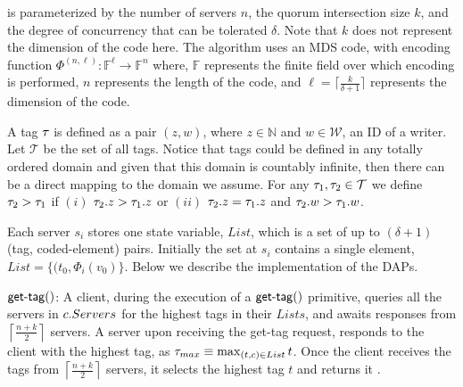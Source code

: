%
\treasmod{} is parameterized by the number of servers $n$, the quorum intersection size $k$, and the degree of concurrency that can be tolerated $\delta$. Note that $k$ does not represent the dimension of the code here. 
%
The algorithm uses an MDS code, with encoding function $\Phi^{(n,\ell)}: \mathbb{F}^{\ell} \rightarrow \mathbb{F}^{n}$ where, $\mathbb{F}$ represents the finite field over which encoding is performed, $n$ represents the length of the code, and $\ell = {\lceil \frac{k}{\delta+1} \rceil} $ represents the dimension of the code. 

A tag $\tau_{}$ is defined as a pair $(z, w)$, where $z \in \mathbb{N}$ and $w \in \mathcal{W}$, an ID of a writer.
Let $\mathcal{T}$ be the set of all tags.
Notice that tags could be defined in any totally ordered domain and given that this domain is countably infinite, then 
there can be a direct mapping to the domain we assume. 
For any  $\tau_{1}, \tau_{2} \in \mathcal{T}$ we define  $\tau_{2} > \tau_{1}$ if $(i)$ $\tau_{2}.z > \tau_{1}.z$ or $(ii)$ $\tau_{2}.z = \tau_{1}.z$ and $\tau_{2}.w > \tau_{1}.w$.

 Each server $s_i$ stores one  state variable,  $List$,  which is a set of up to $(\delta + 1)$  (tag, coded-element) pairs. Initially the set at $s_i$ contains a single element, $List = \{ (t_0,  \Phi_i(v_0)\}$.   Below we describe the implementation of the DAPs.
%

$\dagettag{c}$: A  client,  during the execution of a  $\dagettag{c}$ primitive, queries all the servers in $c.Servers$ for the highest tags in their  $Lists$, and awaits responses from $\left\lceil \frac{n+k}{2} \right\rceil$ servers.
A server upon receiving the {\sc get-tag} request, 
responds to the client with the highest tag, as $\tau_{max} \equiv \max_{(t,c) \in List}t$. 
Once the client receives the tags from $\left\lceil \frac{n+k}{2} \right\rceil$ servers,  it selects  the highest  tag $t$ and returns it . 

